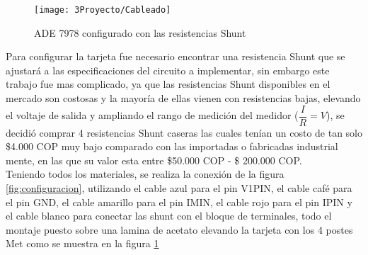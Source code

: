 \begin{figure}[H]
\begin{center}
\texttt{[image: 3Proyecto/Cableado]}
\caption{ ADE 7978 configurado con las resistencias Shunt} 
\label{fig:Cableado}
\end{center}
\end{figure}
Para configurar la tarjeta fue necesario encontrar una resistencia Shunt que se ajustará a las especificaciones del circuito a implementar, sin embargo este trabajo fue mas complicado, ya que las resistencias Shunt disponibles en el mercado son costosas y la mayoría de ellas vienen con resistencias bajas, elevando el voltaje de salida y ampliando el rango de medición del medidor ($\dfrac{I}{R}=V$), se decidió comprar 4 resistencias Shunt caseras las cuales tenían un costo de tan solo \$4.000 COP muy bajo comparado con las importadas o fabricadas industrial mente, en las que su valor esta entre \$50.000 COP - \$ 200.000 COP.\\
Teniendo todos los materiales, se realiza la conexión de la figura \ref{fig:configuracion}, utilizando el cable azul para el pin V1PIN, el cable café para el pin GND, el cable amarillo para el pin IMIN, el cable rojo para el pin IPIN y el cable blanco para conectar las shunt con el bloque de terminales, todo el montaje puesto sobre una lamina de acetato elevando la tarjeta con los 4 postes Met como se muestra en la figura \ref{fig:Cableado}\\

